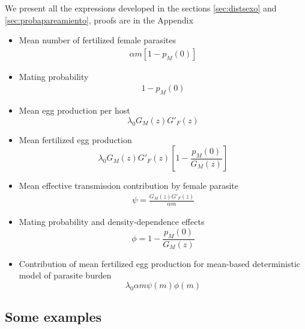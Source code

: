 \documentclass[bimj,fleqn]{w-art}
\theoremstyle{plain}
\theoremstyle{definition}
\begin{document}
We present all the expressions developed in the sections \ref{sec:distsexo} and \ref{sec:probapareamiento}, proofs  are  in the Appendix %
\begin{itemize}
	\item Mean number of fertilized female parasites
	\begin{align}
	\alpha m \left[1-p_M(0) \right] 
	\end{align}
	
	\item Mating probability 
	\begin{align}
	1-p_M(0) 
	\end{align}
	
	\item Mean egg production per host
	\begin{equation}
	\lambda_0G_M(z)G'_F(z)
	\end{equation}
	
	\item Mean fertilized egg production
	\begin{equation}
	\lambda_0 G_M(z) G'_F(z)\left[ 1-\frac{p_M(0)}{G_M(z)}\right]
	\end{equation}
	
	\item Mean effective transmission contribution by female parasite
	\begin{align}
	\psi=\frac{G_M(z)G'_F(z)}{\alpha m}
	\end{align}
	
	\item Mating probability and density-dependence effects
	\begin{equation}
	\phi= 1-\frac{p_M(0)}{G_M(z)}
	\end{equation}
	
	\item Contribution of mean fertilized egg production for mean-based deterministic model  of parasite burden
	\begin{equation}
	\lambda_0 \alpha m \psi(m) \phi(m)
	\end{equation}
\end{itemize}


\subsection{Some examples}
\end{document}
